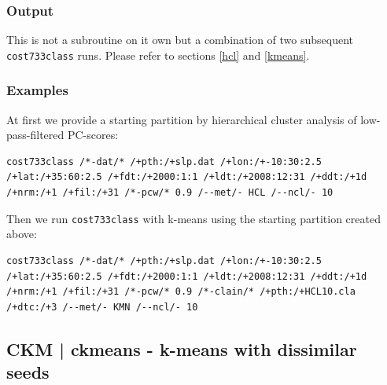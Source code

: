 \documentclass[12pt, oneside, a4paper, headsepline, plainheadsepline]{scrbook}
\begin{document}
\subsubsection*{Output}
This is not a subroutine on it own but a combination of two subsequent \verb+cost733class+ runs. Please refer to sections \ref{hcl} and \ref{kmeans}.

\subsubsection*{Examples}
At first we provide a starting partition by hierarchical cluster analysis of low-pass-filtered PC-scores:
\begin{lstlisting}
cost733class /*-dat/* /+pth:/+slp.dat /+lon:/+-10:30:2.5 /+lat:/+35:60:2.5 /+fdt:/+2000:1:1 /+ldt:/+2008:12:31 /+ddt:/+1d /+nrm:/+1 /+fil:/+31 /*-pcw/* 0.9 /--met/- HCL /--ncl/- 10
\end{lstlisting}
Then we run \verb+cost733class+ with k-means using the starting partition created above:
\begin{lstlisting}
cost733class /*-dat/* /+pth:/+slp.dat /+lon:/+-10:30:2.5 /+lat:/+35:60:2.5 /+fdt:/+2000:1:1 /+ldt:/+2008:12:31 /+ddt:/+1d /+nrm:/+1 /+fil:/+31 /*-pcw/* 0.9 /*-clain/* /+pth:/+HCL10.cla /+dtc:/+3 /--met/- KMN /--ncl/- 10
\end{lstlisting}

\subsection{CKM | ckmeans - k-means with dissimilar seeds}
\end{document}
